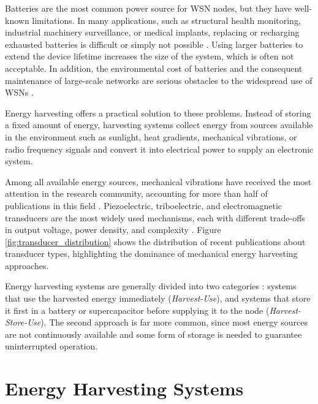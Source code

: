 Batteries are the most common power source for WSN nodes, 
but they have well-known limitations. In many applications, such as structural health monitoring, industrial 
machinery surveillance, or medical implants, replacing or 
recharging exhausted batteries is difficult or simply not
possible \cite{grossiEnergyHarvestingStrategies2021}. Using 
larger batteries to extend the device lifetime increases the 
size of the system, which is often not acceptable. In 
addition, the environmental cost of batteries and the consequent 
maintenance of large-scale networks are serious 
obstacles to the widespread use of WSNs 
\cite{leonavilaEnergyHarvestingTechniques2025}.

Energy harvesting offers a practical solution to these 
problems. Instead of storing a fixed amount of energy, 
harvesting systems collect energy from sources available in 
the environment such as sunlight, heat gradients, mechanical 
vibrations, or radio frequency signals and convert it 
into electrical power to supply an electronic system.

Among all available energy sources, mechanical vibrations 
have received the most attention in the research community, 
accounting for more than half of publications in this field 
\cite{leonavilaEnergyHarvestingTechniques2025}. 
Piezoelectric, triboelectric, and electromagnetic transducers 
are the most widely used mechanisms, each with different 
trade-offs in output voltage, power density, and complexity 
\cite{roundyStudyLowLevel2003a, 
grossiEnergyHarvestingStrategies2021}.
Figure \ref{fig:transducer_distribution} shows the 
distribution of recent publications about transducer types, 
highlighting the dominance of mechanical energy harvesting 
approaches.




Energy harvesting systems are generally divided into two 
categories \cite{grossiEnergyHarvestingStrategies2021}: 
systems that use the harvested energy immediately 
(\emph{Harvest-Use}), and systems that store it first in a 
battery or supercapacitor before supplying it to the node 
(\emph{Harvest-Store-Use}). The second approach is far more 
common, since most energy sources are not continuously 
available and some form of storage is needed to guarantee 
uninterrupted operation.


\section{Energy Harvesting Systems}

